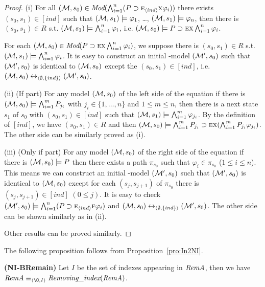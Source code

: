 \documentclass{article}
\begin{document}
\begin{proof}
(i)  For all $({\cal M}, s_0) \in \textit{Mod}(\bigwedge_{i=1}^n (P\supset \textsc{e}_{{\langle{ind}\rangle}} \textsc{x} \varphi_i))$ there exists $(s_0, s_1)\in [ind]$ such that $({\cal M}, s_1) \models \varphi_1$, \dots, $({\cal M}, s_1) \models \varphi_n$, then there is $(s_0, s_1)\in R$ s.t. $({\cal M}, s_1) \models \bigwedge_{i=1}^n \varphi_i$, i.e. $({\cal M}, s_0) \models P\supset \textsc{e} \textsc{x} \bigwedge_{i=1}^n \varphi_i$.

For each $({\cal M}, s_0) \in \textit{Mod}(P\supset \textsc{e} \textsc{x} \bigwedge_{i=1}^n \varphi_i)$, we suppose there is $(s_0, s_1)\in R$ s.t. $({\cal M}, s_1) \models \bigwedge_{i=1}^n \varphi_i$. It is easy to construct an initial \Ind-model $({\cal M}', s_0)$ such that $({\cal M}', s_0)$ is identical to $({\cal M}, s_0)$ except the $(s_0, s_1) \in [ind]$, i.e. $({\cal M}, s_0) \leftrightarrow_{{\langle{\emptyset, \{ind\}}\rangle}} ({\cal M}', s_0)$.

(ii) (If part) For any model $({\cal M},s_0)$ of the left side of the equation if there is $({\cal M},s_0) \models \bigwedge_{i=1}^m P_{j_i}$ with $j_i \in \{1, \dots, n\}$ and $1\leq m \leq n$, then there is a next state $s_1$ of $s_0$ with $(s_0, s_1) \in [ind]$ such that $({\cal M}, s_1) \models \bigwedge_{i=1}^m \varphi_{j_i}$. By the definition of $[ind]$, we have $(s_0, s_1) \in R$ and then $({\cal M}, s_0) \models \bigwedge_{i=1}^m P_{j_i} \supset \textsc{e} \textsc{x} (\bigwedge_{i=1}^m P_{j_i} \varphi_{j_i})$. The other side can be similarly proved as (i).

(iii) (Only if part) For any model $({\cal M},s_0)$ of the right side of the equation if there is $({\cal M},s_0) \models P$ then there exists a path $\pi_{s_0}$ such that $\varphi_i \in \pi_{s_0}$ ($1\leq i \leq n$). This means we can construct an initial \Ind-model $({\cal M}', s_0)$ such that $({\cal M}', s_0)$ is identical to $({\cal M}, s_0)$ except for each $(s_j, s_{j+1})$ of $\pi_{s_0}$ there is $(s_j, s_{j+1}) \in [ind]$ $(0\leq j)$. It is easy to check $({\cal M}', s_0) \models \bigwedge_{i=1}^n (P\supset \textsc{e}_{{\langle{ind}\rangle}} \textsc{f} \varphi_i)$ and  $({\cal M}, s_0) \leftrightarrow_{{\langle{\emptyset, \{ind\}}\rangle}} ({\cal M}', s_0)$.  The other side can be shown similarly as in (ii).

Other results can be proved similarly.
\end{proof}

The following proposition follows from Proposition~\ref{pro:In2NI}.

\begin{proposition}\label{lem:No:Ind}
\textbf{(NI-BRemain)}
Let $I$ be the set of indexes appearing in $\emph{RemA}$, then
we have $\emph{RemA}\equiv_{\tuple{{\O}, I}} \emph{Removing\_index}(\emph{RemA})$.
\end{proposition}
\end{document}
